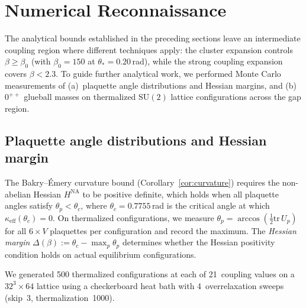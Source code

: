 \documentclass[11pt]{article}
\theoremstyle{definition}
\newcommand{\SU}{\mathrm{SU}}
\newcommand{\tr}{\mathrm{tr}}
\begin{document}
\section{Numerical Reconnaissance}\label{sec:numerical}

The analytical bounds established in the preceding sections leave an
intermediate coupling region where different techniques apply: the
cluster expansion controls $\beta\ge\beta_0$ (with
$\beta_0=150$ at $\theta_*=0.20$\,rad), while the strong coupling
expansion covers $\beta<2.3$.  To guide further analytical
work, we performed Monte Carlo measurements of
(a)~plaquette angle distributions and Hessian margins, and
(b)~$0^{++}$ glueball masses on thermalized $\SU(2)$ lattice
configurations across the gap region.

\subsection{Plaquette angle distributions and Hessian margin}

The Bakry--\'Emery curvature bound
(Corollary~\ref{cor:curvature}) requires the non-abelian
Hessian $H^{\mathrm{NA}}$ to be positive definite, which holds
when all plaquette angles satisfy $\theta_p<\theta_c$, where
$\theta_c=0.7755$\,rad is the critical angle at which
$\kappa_{\mathrm{eff}}(\theta_c)=0$.  On thermalized
configurations, we measure $\theta_p=\arccos(\tfrac{1}{2}\tr\,U_p)$
for all $6\times V$ plaquettes per configuration and record the
maximum.  The \emph{Hessian margin}
$\Delta(\beta):=\theta_c-\max_p\theta_p$
determines whether the Hessian positivity condition holds
on actual equilibrium configurations.

We generated 500 thermalized configurations at each of 21~coupling
values on a $32^3\times 64$ lattice using a checkerboard heat bath
with 4~overrelaxation sweeps (skip~3, thermalization~1000).
\end{document}

